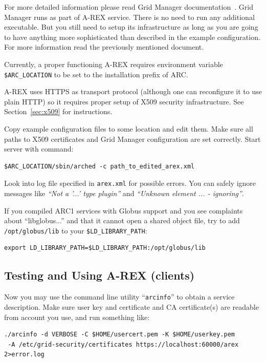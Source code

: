 \documentclass{article}                            %
\begin{document}
For more detailed information please read Grid Manager
documentation~\cite{arex}. Grid Manager runs as part of A-REX service. There is
no need to run any additional executable. But you still need to setup its
infrastructure as long as you are going to have anything more sophisticated than
described in the example configuration. For more information read the previously
mentioned document.

Currently, a proper functioning A-REX requires environment variable
\verb|$ARC_LOCATION| to be set to the installation prefix of ARC.

A-REX uses HTTPS as transport protocol (although one can reconfigure it to use
plain HTTP) so it requires proper setup of X509 security infrastructure. See
Section~\ref{sec:x509} for instructions.

Copy example configuration files to some location and edit them. Make sure all
paths to X509 certificates and Grid Manager configuration are set correctly.
Start server with command:

\begin{lstlisting}
$ARC_LOCATION/sbin/arched -c path_to_edited_arex.xml
\end{lstlisting}

Look into log file specified in \texttt{arex.xml} for possible errors. You can
safely ignore messages like \textit{``Not a '...' type plugin''} and
\textit{``Unknown element ... - ignoring''}.

If you compiled ARC1 services with Globus support and you see complaints about
``libglobus...'' and that it cannot open a shared object file, try to add
\texttt{/opt/globus/lib} to your \verb|$LD_LIBRARY_PATH|:

\begin{lstlisting}
export LD_LIBRARY_PATH=$LD_LIBRARY_PATH:/opt/globus/lib
\end{lstlisting}

\subsection{Testing and Using A-REX (clients)}
\label{sec:testing}

Now you may use the command line utility ``\texttt{arcinfo}'' to obtain a service
description. Make sure user key and certificate and CA certificate(s) are
readable from account you use, and run something like:

\begin{lstlisting}
./arcinfo -d VERBOSE -C $HOME/usercert.pem -K $HOME/userkey.pem
 -A /etc/grid-security/certificates https://localhost:60000/arex 2>error.log
\end{lstlisting}
\end{document}
